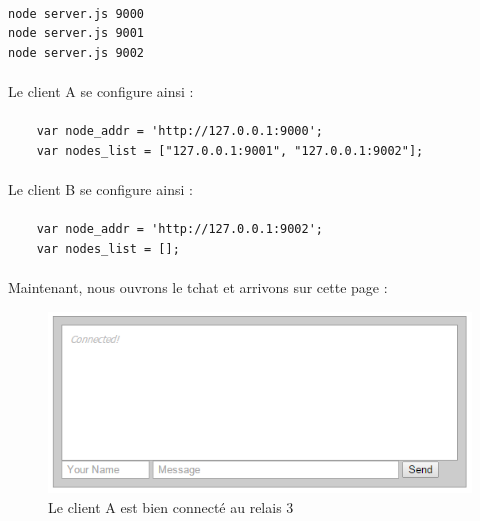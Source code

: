 \documentclass[a4paper,12pt]{report}
\begin{document}
	\paragraph*{}
	\begin{lstlisting}
node server.js 9000
node server.js 9001
node server.js 9002
	\end{lstlisting}
	
	\paragraph*{}
	Le client A se configure ainsi :
	
	\paragraph*{}
	\begin{lstlisting}
	var node_addr = 'http://127.0.0.1:9000';
	var nodes_list = ["127.0.0.1:9001", "127.0.0.1:9002"];
	\end{lstlisting}	
	
	\paragraph*{}
	Le client B se configure ainsi :
	
	\paragraph*{}
	\begin{lstlisting}
	var node_addr = 'http://127.0.0.1:9002';
	var nodes_list = [];
	\end{lstlisting}
	
	\paragraph*{}
	Maintenant, nous ouvrons le tchat et arrivons sur cette page :
	
	\begin{figure}[h] %
		\includegraphics[scale=0.8]{chat_connected.png}
		\caption{Le client A est bien connecté au relais 3}
		\label{project}
	\end{figure}	
	
\end{document}
